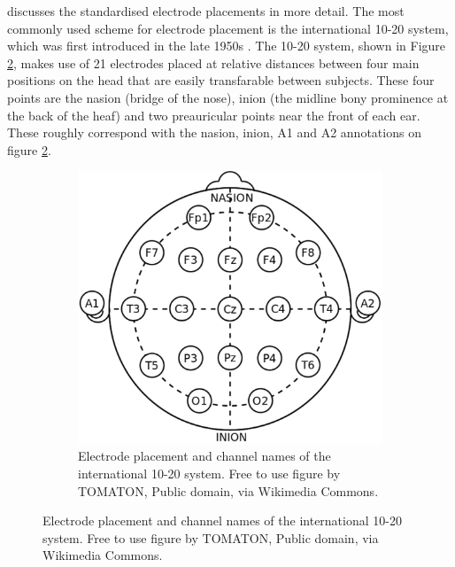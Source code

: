  discusses the standardised electrode placements in more detail.
The most commonly used scheme for electrode placement is the international 10-20 system, which was first introduced in the late 1950s \citep{internat_1020_system}.
The 10-20 system, shown in Figure \ref{fig:biomedical_signals_10_20_system_original}, makes use of 21 electrodes placed at relative distances between four main positions on the head that are easily transfarable between subjects.
These four points are the nasion (bridge of the nose), inion (the midline bony prominence at the back of the heaf) and two preauricular points near the front of each ear.
These roughly correspond with the nasion, inion, A1 and A2 annotations on figure \ref{fig:biomedical_signals_10_20_system_original}.

\begin{figure}[ht]
    \centering
    \begin{subfigure}{0.45\textwidth}
        \centering
        \includegraphics[width=\textwidth]{../images/biosignals/10-20_system.pdf}
        \captionsetup{width=\linewidth}
        \captionsetup{justification=centering}
        \caption{Electrode placement and channel names of the international 10-20 system. Free to use figure by TOMATON, Public domain, via Wikimedia Commons.\\ \hfill}
        \label{fig:biomedical_signals_10_20_system_original}
    \end{subfigure}
    \hfill

\end{figure}
